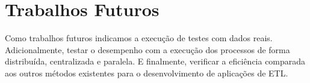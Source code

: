 \section{Trabalhos Futuros}

Como trabalhos futuros indicamos a execução de testes com dados reais. Adicionalmente, testar o desempenho com a execução dos processos de forma distribuída, centralizada e paralela. E finalmente, verificar a eficiência comparada aos outros métodos existentes para o desenvolvimento de aplicações de ETL.



